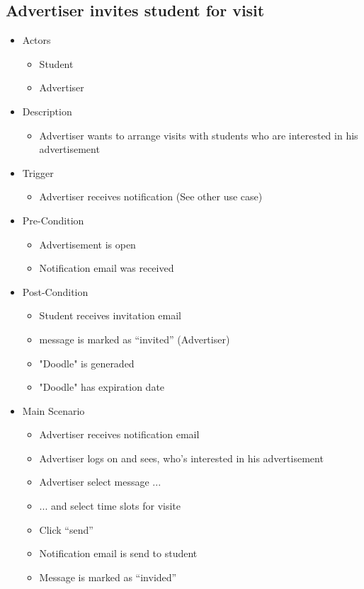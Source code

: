 \documentclass[a4paper,11pt]{article}
\begin{document}
\subsection*{Advertiser invites student for visit}
\begin{itemize}
  \item Actors
    \begin{itemize}
      \item Student
      \item Advertiser
    \end{itemize}
  \item Description
    \begin{itemize}
      \item Advertiser wants to arrange visits with students who are interested in his advertisement
    \end{itemize}
  \item Trigger
    \begin{itemize}
      \item Advertiser receives notification (See other use case)
    \end{itemize}
  \item Pre-Condition
    \begin{itemize}
      \item Advertisement is open
      \item Notification email was received 
    \end{itemize}
  \item Post-Condition
    \begin{itemize}
      \item Student receives invitation email
      \item message is marked as “invited” (Advertiser)
      \item "Doodle" is generaded
      \item "Doodle" has expiration date  
    \end{itemize}
  \item Main Scenario
    \begin{itemize}
      \item Advertiser receives notification email
      \item Advertiser logs on and sees, who's interested in his advertisement
      \item Advertiser select message ...
      \item ... and select time slots for visite
      \item Click “send”
      \item Notification email is send to student 
      \item Message is marked as “invided”
    \end{itemize}


\end{itemize}
\end{document}
